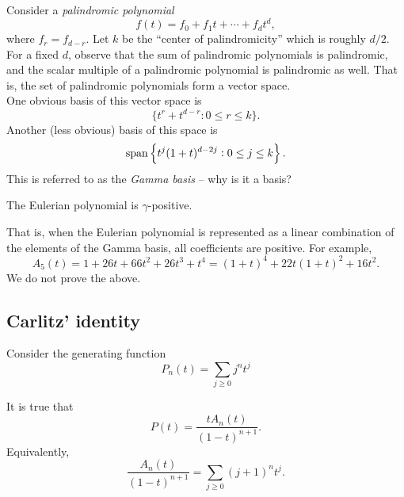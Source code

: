 	Consider a \emph{palindromic polynomial}
	\[ f(t) = f_0 + f_1 t + \cdots + f_dt^d, \]
	where $f_r = f_{d-r}$. Let $k$ be the ``center of palindromicity'' which is roughly $d/2$. For a fixed $d$, observe that the sum of palindromic polynomials is palindromic, and the scalar multiple of a palindromic polynomial is palindromic as well. That is, the set of palindromic polynomials form a vector space.\\
	One obvious basis of this vector space is
	\[ \{ t^r + t^{d-r} : 0 \le r \le k \}. \]
	Another (less obvious) basis of this space is
	\[ \operatorname{span}\left\{ t^j (1+t)^{d-2j} : 0 \le j \le k \right\}. \]
	This is referred to as the \emph{Gamma basis} -- why is it a basis?

	\begin{ftheo}
		The Eulerian polynomial is $\gamma$-positive.
	\end{ftheo}
	That is, when the Eulerian polynomial is represented as a linear combination of the elements of the Gamma basis, all coefficients are positive. For example,
	\[ A_5(t) = 1+26t+66t^2+26t^3+t^4 = (1+t)^4 + 22t(1+t)^2 + 16t^2. \]
	We do not prove the above.

\subsection{Carlitz' identity}

	Consider the generating function
	\[ P_n(t) = \sum_{j \ge 0} j^n t^j \]

	\begin{ftheo}
		It is true that
		\[ P(t) = \frac{tA_n(t)}{(1-t)^{n+1}}. \]
		Equivalently,
		\[ \frac{A_n(t)}{(1-t)^{n+1}} = \sum_{j \ge 0} (j+1)^n t^j. \]
	\end{ftheo}

